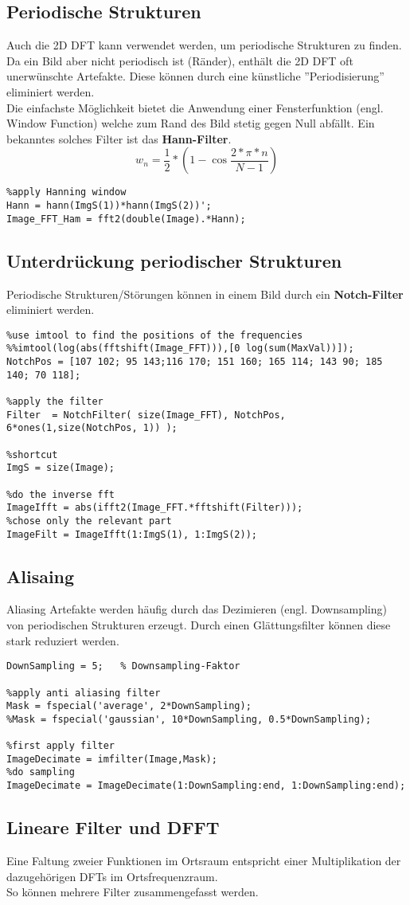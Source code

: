\subsection{Periodische Strukturen}
Auch die 2D DFT kann verwendet werden, um periodische Strukturen zu finden.
Da ein Bild aber nicht periodisch ist (Ränder), enthält die 2D DFT oft unerwünschte Artefakte. Diese können durch eine künstliche ''Periodisierung'' eliminiert werden.\\
Die einfachste Möglichkeit bietet die Anwendung einer Fensterfunktion (engl. Window Function) welche zum Rand des Bild stetig gegen Null abfällt. Ein bekanntes solches Filter ist das \textbf{Hann-Filter}.
\begin{equation}
w_n=\frac{1}{2}*(1-\cos{\frac{2*\pi *n}{N-1}})
\end{equation}
\begin{lstlisting}
%apply Hanning window
Hann = hann(ImgS(1))*hann(ImgS(2))';
Image_FFT_Ham = fft2(double(Image).*Hann);
\end{lstlisting}

\subsection{Unterdrückung periodischer Strukturen}
Periodische Strukturen/Störungen können in einem Bild durch ein \textbf{Notch-Filter} eliminiert werden.
\begin{lstlisting}
%use imtool to find the positions of the frequencies
%%imtool(log(abs(fftshift(Image_FFT))),[0 log(sum(MaxVal))]);
NotchPos = [107 102; 95 143;116 170; 151 160; 165 114; 143 90; 185 140; 70 118];

%apply the filter 
Filter  = NotchFilter( size(Image_FFT), NotchPos, 6*ones(1,size(NotchPos, 1)) );

%shortcut
ImgS = size(Image);

%do the inverse fft
ImageIfft = abs(ifft2(Image_FFT.*fftshift(Filter)));
%chose only the relevant part
ImageFilt = ImageIfft(1:ImgS(1), 1:ImgS(2));
\end{lstlisting}

\subsection{Alisaing}
Aliasing Artefakte werden häufig durch das Dezimieren (engl. Downsampling) von periodischen Strukturen erzeugt. Durch einen Glättungsfilter können diese stark reduziert werden.
\begin{lstlisting}
DownSampling = 5;   % Downsampling-Faktor

%apply anti aliasing filter
Mask = fspecial('average', 2*DownSampling);
%Mask = fspecial('gaussian', 10*DownSampling, 0.5*DownSampling);

%first apply filter
ImageDecimate = imfilter(Image,Mask);
%do sampling
ImageDecimate = ImageDecimate(1:DownSampling:end, 1:DownSampling:end);
\end{lstlisting}

\subsection{Lineare Filter und DFFT}
Eine Faltung zweier Funktionen im Ortsraum entspricht einer Multiplikation der dazugehörigen DFTs im Ortsfrequenzraum.\\
So können mehrere Filter zusammengefasst werden.